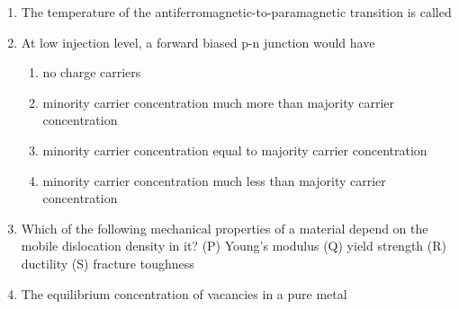 \documentclass[a4paper,10pt]{article}
\begin{document}
\begin{enumerate}
    \item The temperature of the antiferromagnetic-to-paramagnetic transition is called
    
    \hfill{}
    \begin{enumerate}[label=\Alph*)]
    \end{enumerate}

    \item At low injection level, a forward biased p-n junction would have
    
    \hfill{}
    \begin{enumerate}[label=\Alph*)]
        \item no charge carriers
        \item minority carrier concentration much more than majority carrier concentration
        \item minority carrier concentration equal to majority carrier concentration
        \item minority carrier concentration much less than majority carrier concentration
    \end{enumerate}

    \item Which of the following mechanical properties of a material depend on the mobile dislocation density in it?
    (P) Young's modulus \quad (Q) yield strength \quad (R) ductility \quad (S) fracture toughness
    
    \hfill{}
    \begin{enumerate}[label=\Alph*)]
    \end{enumerate}

    \item The equilibrium concentration of vacancies in a pure metal
    

\end{enumerate}
\end{document}
